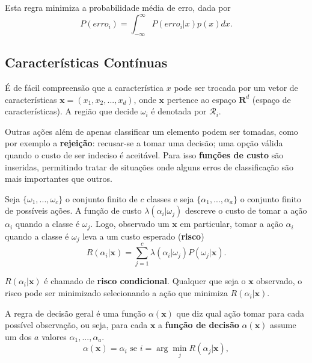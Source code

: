 \documentclass[a4paper,12pt,twocolumn]{article}
\begin{document}
Esta regra minimiza a probabilidade média de erro, dada por
\begin{equation}
    P(erro_i) = \int_{-\infty}^{\infty} P(erro_i|x)p(x) dx.
    \label{eq:bayes}
\end{equation}

\subsection{Características Contínuas}

É de fácil compreensão que a característica $x$ pode ser trocada por um vetor de características $\boldsymbol{x} = (x_1, x_2, ..., x_d)$, onde $\boldsymbol{x}$ pertence ao espaço $\boldsymbol{R}^d$ (espaço de características). A região que decide $\omega_i$ é denotada por $\mathcal{R}_i$.

Outras ações além de apenas classificar um elemento podem ser tomadas, como por exemplo a \textbf{rejeição}: recusar-se a tomar uma decisão; uma opção válida quando o custo de ser indeciso é aceitável. Para isso \textbf{funções de custo} são inseridas, permitindo tratar de situações onde alguns erros de classificação são mais importantes que outros.

Seja $\{\omega_1, ..., \omega_c\}$ o conjunto finito de $c$ classes e seja $\{\alpha_1, ..., \alpha_a\}$ o conjunto finito de possíveis ações. A função de custo $\lambda(\alpha_i|\omega_j)$ descreve o custo de tomar a ação $\alpha_i$ quando a classe é $\omega_j$. Logo, observado um $\boldsymbol{x}$ em particular, tomar a ação $\alpha_i$ quando a classe é $\omega_j$ leva a um custo esperado (\textbf{risco})
\begin{equation}
    R(\alpha_i|\boldsymbol{x}) = \sum_{j=1}^c \lambda(\alpha_i|\omega_j) P(\omega_j|\boldsymbol{x}).
    \label{eq:conditional_risk}
\end{equation}

$R(\alpha_i|\boldsymbol{x})$ é chamado de \textbf{risco condicional}. Qualquer que seja o $\boldsymbol{x}$ observado, o risco pode ser minimizado selecionando a ação que minimiza $R(\alpha_i|\boldsymbol{x})$.

A regra de decisão geral é uma função $\alpha(\boldsymbol{x})$ que diz qual ação tomar para cada possível observação, ou seja, para cada $\boldsymbol{x}$ a \textbf{função de decisão} $\alpha(\boldsymbol{x})$ assume um dos $a$ valores $\alpha_1, ..., \alpha_a$.
\begin{equation}
    \alpha(\boldsymbol{x}) = \alpha_i \text{ se } i = \arg\min_j R(\alpha_j|\boldsymbol{x}),
    \label{eq:decision_4}
\end{equation}
\end{document}
